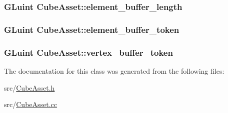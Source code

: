 \subsubsection[{element\+\_\+buffer\+\_\+length}]{\setlength{\rightskip}{0pt plus 5cm}G\+Luint Cube\+Asset\+::element\+\_\+buffer\+\_\+length\hspace{0.3cm}{\ttfamily [private]}}\label{classCubeAsset_ac66c2ec869f392515dad4ebda1fe4792}
\hypertarget{classCubeAsset_a4fae699256e7c5633a8174a93ca8a0ec}{}
\subsubsection[{element\+\_\+buffer\+\_\+token}]{\setlength{\rightskip}{0pt plus 5cm}G\+Luint Cube\+Asset\+::element\+\_\+buffer\+\_\+token\hspace{0.3cm}{\ttfamily [private]}}\label{classCubeAsset_a4fae699256e7c5633a8174a93ca8a0ec}
\hypertarget{classCubeAsset_a31bd098f60e2c24988316a9cc9335987}{}
\subsubsection[{vertex\+\_\+buffer\+\_\+token}]{\setlength{\rightskip}{0pt plus 5cm}G\+Luint Cube\+Asset\+::vertex\+\_\+buffer\+\_\+token\hspace{0.3cm}{\ttfamily [private]}}\label{classCubeAsset_a31bd098f60e2c24988316a9cc9335987}


The documentation for this class was generated from the following files\+:\begin{DoxyCompactItemize}
\item 
src/\hyperlink{CubeAsset_8h}{Cube\+Asset.\+h}\item 
src/\hyperlink{CubeAsset_8cc}{Cube\+Asset.\+cc}\end{DoxyCompactItemize}
